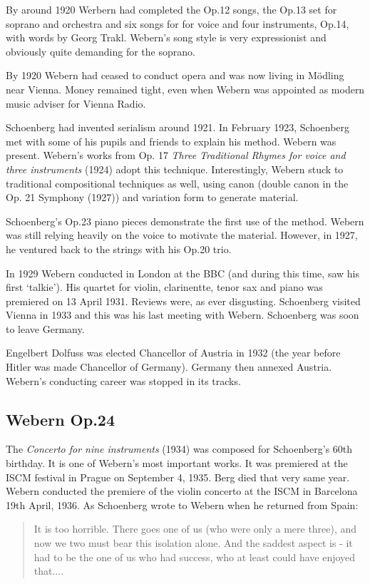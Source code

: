 By around 1920 Werbern had completed the Op.12 songs, the Op.13 set for soprano and orchestra and six songs for for voice and four instruments, Op.14, with words by Georg Trakl. Webern's song style is very expressionist and obviously quite demanding for the soprano. 

By 1920 Webern had ceased to conduct opera and was now living in M\"odling near Vienna. Money remained tight, even when Webern was appointed as modern music adviser for Vienna Radio.  

Schoenberg had invented serialism around 1921. In February 1923, Schoenberg met with some of his pupils and friends to explain his method. Webern was present. Webern's works from Op. 17 \textit{Three Traditional Rhymes for voice and three instruments} (1924) adopt this technique. Interestingly, Webern stuck to traditional compositional techniques as well, using canon (double canon in the Op. 21 Symphony (1927)) and variation form to generate material. 

Schoenberg's Op.23 piano pieces demonstrate the first use of the method. Webern was still relying heavily on the voice to motivate the material. However, in 1927, he ventured back to the strings with his Op.20 trio. 
  
In 1929 Webern conducted in London at the BBC (and during this time, saw his first `talkie'). His quartet for violin, clarinentte, tenor sax and piano was premiered on 13 April 1931. Reviews were, as ever disgusting. Schoenberg visited Vienna in 1933 and this was his last meeting with Webern. Schoenberg was soon to leave Germany. 

Engelbert Dolfuss was elected Chancellor of Austria in 1932 (the year before Hitler was made Chancellor of Germany). Germany then annexed Austria. Webern's conducting career was stopped in its tracks. 

\subsection{Webern Op.24}
 
The \textit{Concerto for nine instruments} (1934) was composed for Schoenberg's 60th birthday. It is one of Webern's most important works. It was premiered at the ISCM festival in Prague on September 4, 1935. Berg died that very same year. Webern conducted the premiere of the violin concerto at the ISCM in Barcelona 19th April, 1936. As Schoenberg wrote to Webern when he returned from Spain:

\begin{quote}
It is too horrible. There goes one of us (who were only a mere three), and now we two must bear this isolation alone. And the saddest aspect is - it had to be the one of us who had success, who at least could have enjoyed that....
\end{quote}


